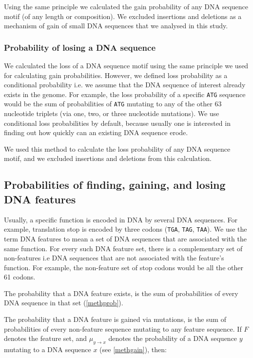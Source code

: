 \documentclass[12pt,a4paper]{article}
\begin{document}
Using the same principle we calculated the gain probability of any DNA sequence motif (of any length or composition). We excluded insertions and deletions as a mechanism of gain of small DNA sequences that we analysed in this study. 

\subsubsection{Probability of losing a DNA sequence}

We calculated the loss of a DNA sequence motif using the same principle we used for calculating gain probabilities. However, we defined loss probability as a conditional probability i.e. we assume that the DNA sequence of interest already exists in the genome. For example, the loss probability of a specific \texttt{ATG} sequence would be the sum of probabilities of \texttt{ATG} mutating to any of the other 63 nucleotide triplets (via one, two, or three nucleotide mutations). We use conditional loss probabilities by default, because usually one is interested in finding out how quickly can an existing DNA sequence erode.

We used this method to calculate the loss probability of any DNA sequence motif, and we excluded insertions and deletions from this calculation.

\subsection{Probabilities of finding, gaining, and losing DNA features}
\label{methfeatures}

Usually, a specific function is encoded in DNA by several DNA sequences. For example, translation stop is encoded by three codons (\texttt{TGA}, \texttt{TAG}, \texttt{TAA}). We use the term DNA features to mean a set of DNA sequences that are associated with the same function. For every such DNA feature set, there is a complementary set of non-features i.e DNA sequences that are not associated with the feature's function. For example, the non-feature set of stop codons would be all the other 61 codons. 

The probability that a DNA feature exists, is the sum of probabilities of every DNA sequence in that set (\autoref{methprob}).

The probability that a DNA feature is gained via mutations, is the sum of probabilities of every non-feature sequence mutating to any feature sequence. If $F$ denotes the feature set, and $\mu_{y\to x}$ denotes the probability of a DNA sequence $y$ mutating to a DNA sequence $x$ (see \autoref{methgain}), then:
\end{document}
